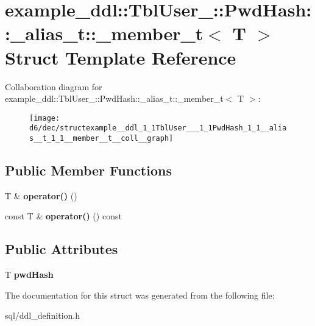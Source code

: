 \hypertarget{structexample__ddl_1_1TblUser___1_1PwdHash_1_1__alias__t_1_1__member__t}{}\section{example\+\_\+ddl\+:\+:Tbl\+User\+\_\+\+:\+:Pwd\+Hash\+:\+:\+\_\+alias\+\_\+t\+:\+:\+\_\+member\+\_\+t$<$ T $>$ Struct Template Reference}
\label{structexample__ddl_1_1TblUser___1_1PwdHash_1_1__alias__t_1_1__member__t}


Collaboration diagram for example\+\_\+ddl\+:\+:Tbl\+User\+\_\+\+:\+:Pwd\+Hash\+:\+:\+\_\+alias\+\_\+t\+:\+:\+\_\+member\+\_\+t$<$ T $>$\+:
\nopagebreak
\begin{figure}[H]
\begin{center}
\leavevmode
\texttt{[image: d6/dec/structexample\_\_ddl\_1\_1TblUser\_\_\_1\_1PwdHash\_1\_1\_\_alias\_\_t\_1\_1\_\_member\_\_t\_\_coll\_\_graph]}
\end{center}
\end{figure}
\subsection*{Public Member Functions}
\begin{DoxyCompactItemize}
\item 
\hypertarget{structexample__ddl_1_1TblUser___1_1PwdHash_1_1__alias__t_1_1__member__t_aa349bac676d4a67a572b436d37210f56}{}T \& {\bfseries operator()} ()\label{structexample__ddl_1_1TblUser___1_1PwdHash_1_1__alias__t_1_1__member__t_aa349bac676d4a67a572b436d37210f56}

\item 
\hypertarget{structexample__ddl_1_1TblUser___1_1PwdHash_1_1__alias__t_1_1__member__t_a08301fd87e46624f92aa031f21c86530}{}const T \& {\bfseries operator()} () const \label{structexample__ddl_1_1TblUser___1_1PwdHash_1_1__alias__t_1_1__member__t_a08301fd87e46624f92aa031f21c86530}

\end{DoxyCompactItemize}
\subsection*{Public Attributes}
\begin{DoxyCompactItemize}
\item 
\hypertarget{structexample__ddl_1_1TblUser___1_1PwdHash_1_1__alias__t_1_1__member__t_a6c397f89a333c57f5d3f661b9f31b6cc}{}T {\bfseries pwd\+Hash}\label{structexample__ddl_1_1TblUser___1_1PwdHash_1_1__alias__t_1_1__member__t_a6c397f89a333c57f5d3f661b9f31b6cc}

\end{DoxyCompactItemize}


The documentation for this struct was generated from the following file\+:\begin{DoxyCompactItemize}
\item 
sql/ddl\+\_\+definition.\+h\end{DoxyCompactItemize}
